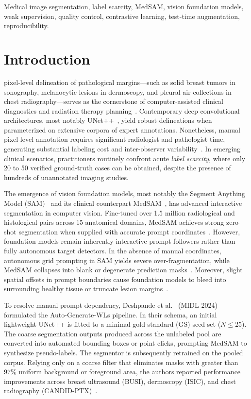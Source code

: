 \documentclass[journal,11pt,onecolumn,draftclsnofoot]{IEEEtran}
\begin{document}
\begin{IEEEkeywords}
Medical image segmentation, label scarcity, MedSAM, vision foundation models, weak supervision, quality control, contrastive learning, test-time augmentation, reproducibility.
\end{IEEEkeywords}

\section{Introduction}
\label{sec:intro}

 pixel-level delineation of pathological margins---such as solid breast tumors in sonography, melanocytic lesions in dermoscopy, and pleural air collections in chest radiography---serves as the cornerstone of computer-assisted clinical diagnostics and radiation therapy planning~\cite{tajbakhsh2020}. Contemporary deep convolutional architectures, most notably UNet++~\cite{zhou2018}, yield robust delineations when parameterized on extensive corpora of expert annotations. Nonetheless, manual pixel-level annotation requires significant radiologist and pathologist time, generating substantial labeling cost and inter-observer variability~\cite{tajbakhsh2020}. In emerging clinical scenarios, practitioners routinely confront acute \emph{label scarcity}, where only 20 to 50 verified ground-truth cases can be obtained, despite the presence of hundreds of unannotated imaging studies.

The emergence of vision foundation models, most notably the Segment Anything Model (SAM)~\cite{kirillov2023} and its clinical counterpart MedSAM~\cite{ma2023medsam}, has advanced interactive segmentation in computer vision. Fine-tuned over 1.5 million radiological and histological pairs across 15 anatomical domains, MedSAM achieves strong zero-shot segmentation when supplied with accurate prompt coordinates~\cite{ma2023medsam}. However, foundation models remain inherently interactive prompt followers rather than fully autonomous target detectors. In the absence of manual coordinates, autonomous grid prompting in SAM yields severe over-fragmentation, while MedSAM collapses into blank or degenerate prediction masks~\cite{deshpande2024}. Moreover, slight spatial offsets in prompt boundaries cause foundation models to bleed into surrounding healthy tissue or truncate lesion margins~\cite{deoliveira2023,he2023sam}.

To resolve manual prompt dependency, Deshpande et al.~\cite{deshpande2024} (MIDL 2024) formulated the Auto-Generate-WLs pipeline. In their schema, an initial lightweight UNet++ is fitted to a minimal gold-standard (GS) seed set ($N \le 25$). The coarse segmentation outputs produced across the unlabeled pool are converted into automated bounding boxes or point clicks, prompting MedSAM to synthesize pseudo-labels. The segmentor is subsequently retrained on the pooled corpus. Relying only on a coarse filter that eliminates masks with greater than 97\% uniform background or foreground area, the authors reported performance improvements across breast ultrasound (BUSI), dermoscopy (ISIC), and chest radiography (CANDID-PTX)~\cite{deshpande2024}.
\end{document}
